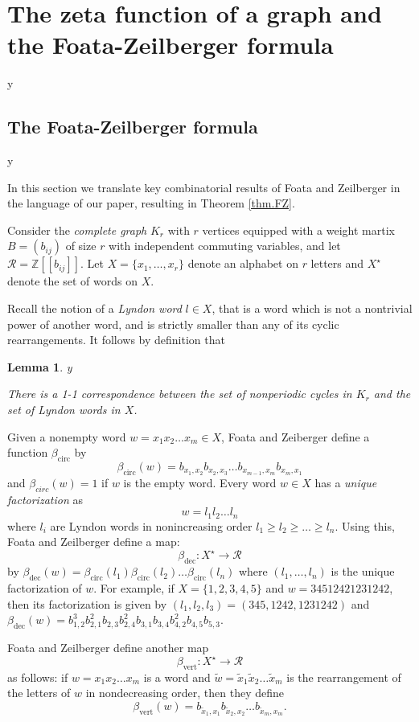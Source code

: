 \documentclass{amsart}
\theoremstyle{plain}
\newtheorem{lemma}[proposition]{Lemma}
\theoremstyle{definition}
\theoremstyle{remark}
\def\printname#1{
        \if\draft y
                \smash{\makebox[0pt]{\hspace{-0.5in}
                        \raisebox{8pt}{\tt\tiny #1}}}
        \fi
}
\def\lbl#1{\label{#1}\printname{#1}}
\def\BZ{\mathbb Z}
\def\R{\mathcal R}
\def\b{\beta}
\def\ti{\widetilde}
\def\longto{\longrightarrow}
\def\dec{\mathrm{dec}}
\def\vert{\mathrm{vert}}
\def\circ{\mathrm{circ}}
\def\longto{\longrightarrow}
\begin{document}
\appendix
\section{The zeta function of a graph and the Foata-Zeilberger formula}
\lbl{sec.FZ}

\subsection{The Foata-Zeilberger formula}
\lbl{sub.FZ}

In this section we translate key combinatorial results of 
Foata and Zeilberger \cite[Theorem 1.1]{FZ} in the language of our paper,
resulting in Theorem \ref{thm.FZ}.

Consider the {\em complete graph} $K_r$ with $r$ vertices equipped with a 
weight martix $B=(b_{ij})$ of size $r$ with independent commuting variables, 
and let $\R=\BZ[[b_{ij}]]$. Let $X=\{x_1,\dots,x_r\}$ denote an alphabet on 
$r$ letters and $X^\star$ denote the set of words on $X$.

Recall the notion of a {\em Lyndon word} $l \in X$, that is a word which is 
not a nontrivial power of another word, and is strictly smaller than any of 
its cyclic rearrangements. It follows by definition that

\begin{lemma}
\lbl{lem.lyndon}
There is a 1-1 correspondence between the set of nonperiodic cycles in $K_r$
and the set of Lyndon words in $X$.
\end{lemma}


Given a nonempty word $w=x_1 x_2 \dots x_m \in X$, Foata and Zeiberger define
a function $\b_{\circ}$ by 
$$
\b_{\circ}(w)=b_{x_1,x_2} b_{x_2, x_3} \dots b_{x_{m-1},x_m} b_{x_m,x_1}
$$
and $\b_{circ}(w)=1$ if $w$ is the empty word. 
Every word $w \in X$ has a {\em unique factorization} as
$$
w=l_1 l_2 \dots l_n
$$
where $l_i$ are Lyndon words in nonincreasing order 
$l_1 \geq l_2 \geq \dots \geq l_n$. Using this, Foata and Zeilberger define
a map:
$$
\b_{\dec}: X^\star \longto \R
$$
by
$\b_{\dec}(w)=\b_{\circ}(l_1) \b_{\circ}(l_2) \dots \b_{\circ}(l_n)$
where $(l_1,\dots,l_n)$ is the unique factorization of $w$. 
For example, if $X=\{1,2,3,4,5\}$ and $w=34512421231242$, then its 
factorization is given by $(l_1,l_2,l_3)=(345,1242,1231242)$ and
$\b_{\dec}(w)=b_{1,2}^3 b_{2,1}^2 b_{2,3} b_{2,4}^2 b_{3,1} b_{3,4} b_{4,2}^2
b_{4,5} b_{5,3}$.
 
Foata and Zeilberger define another map
$$
\b_{\vert}: X^\star \longto \R 
$$
as follows: if $w=x_1 x_2 \dots x_m$ is a word and $\ti{w}=\ti{x}_1 \ti{x}_2
\dots \ti{x}_m$ is the rearrangement of the letters of $w$ in nondecreasing 
order, then they define
$$
\b_{\vert}(w)=b_{\ti{x}_1,x_1} b_{\ti{x}_2,x_2} \dots b_{\ti{x}_m,x_m}. 
$$
\end{document}
